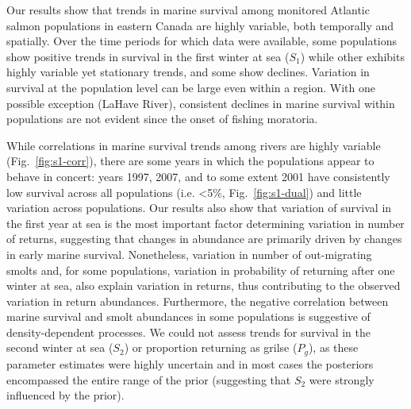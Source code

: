 \documentclass[12pt]{article}
\newcommand{\So}{$S_{1}$\xspace}
\newcommand{\St}{$S_{2}$\xspace}
\newcommand{\Pg}{$P_g$\xspace}
\begin{document}

Our results show that trends in marine survival among monitored Atlantic salmon
populations in eastern Canada are highly variable, both temporally and
spatially. Over the time periods for which data were available, some
populations show positive trends in survival in the first winter at sea (\So)
while other exhibits highly variable yet stationary trends, and some show declines.
Variation in survival at the population level can be large even within a
region. With one possible exception (LaHave River), consistent declines in
marine survival within populations are not evident since the onset of fishing
moratoria.

While correlations in marine survival trends among rivers are highly
variable (Fig.~\ref{fig:s1-corr}),
there are some years in which the populations appear to behave in concert:
years 1997, 2007, and to some extent 2001 have consistently low survival across all populations
(i.e. <5\%, Fig.~\ref{fig:s1-dual}) and little variation across populations.
Our results also show that variation of survival in the first year at sea is the most
important factor determining variation in number of returns, suggesting that
changes in abundance are primarily driven by changes in early marine survival.
Nonetheless, variation in number of out-migrating smolts and, for some populations,
variation in probability of returning after one winter at sea, also explain
variation in returns, thus contributing to the observed variation in return abundances.
Furthermore, the negative correlation between marine survival and smolt
abundances in some populations is suggestive of density-dependent processes.
We could not assess trends for survival in the second winter at sea (\St) or
proportion returning as grilse (\Pg), as these parameter estimates were highly
uncertain and in most cases the posteriors encompassed the entire range of
the prior (suggesting that \St were strongly influenced by the prior).

\end{document}
